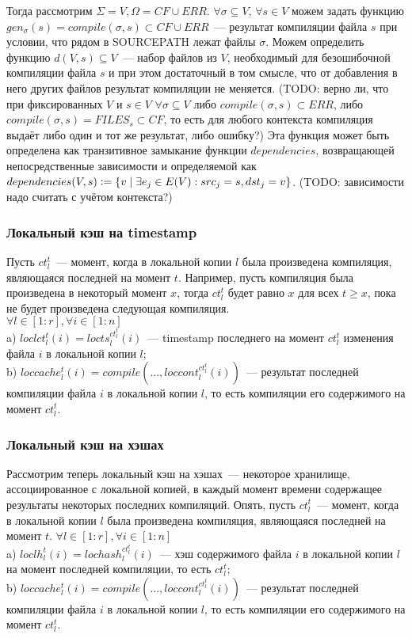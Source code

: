 Тогда рассмотрим $\Sigma = V, \Omega = CF \cup ERR$. $\forall \sigma \subseteq V$, $\forall s \in V$ можем задать функцию $gen_\sigma(s) = \textit{compile}(\sigma, s) \subset CF \cup ERR$~--- результат компиляции файла $s$ при условии, что рядом в SOURCEPATH лежат файлы $\sigma$. Можем определить функцию $d(V,s) \subseteq V$~--- набор файлов из $V$, необходимый для безошибочной компиляции файла $s$ и при этом достаточный в том смысле, что от добавления в него других файлов результат компиляции не меняется. (TODO: верно ли, что при фиксированных $V$ и $s \in V$ $\forall \sigma \subseteq V$ либо $\textit{compile}(\sigma, s) \subset ERR$, либо $\textit{compile}(\sigma, s) = FILES_s \subset CF$, то есть для любого контекста компиляция выдаёт либо один и тот же результат, либо ошибку?) Эта функция может быть определена как транзитивное замыкание функции $dependencies$, возвращающей непосредственные зависимости и определяемой как $dependencies(V,s) \vcentcolon= \{v \mid \exists e_j \in E(V): src_j = s, dst_j = v\}$. (TODO: зависимости надо считать с учётом контекста?)

\subsubsection{Локальный кэш на timestamp}

Пусть $ct_l^t$~--- момент, когда в локальной копии $l$ была произведена компиляция, являющаяся последней на момент $t$. Например, пусть компиляция была произведена в некоторый момент $x$, тогда $ct_l^t$ будет равно $x$ для всех $t \geqslant x$, пока не будет произведена следующая компиляция.\\
$\forall l \in [1:r], \forall i \in [1:n]$\\
\indent a) $loclct_l^t(i) = locts_l^{ct_l^t}(i)$~--- timestamp последнего на момент $ct_l^t$ изменения файла $i$ в локальной копии $l$;\\
\indent b) $loccache_l^t(i) = compile(..., loccont_l^{ct_l^t}(i))$~--- результат последней компиляции файла $i$ в локальной копии $l$, то есть компиляции его содержимого на момент $ct_l^t$.\\

\subsubsection{Локальный кэш на хэшах}

Рассмотрим теперь локальный кэш на хэшах~--- некоторое хранилище, ассоциированное с локальной копией, в каждый момент времени содержащее результаты некоторых последних компиляций. Опять, пусть $ct_l^t$~--- момент, когда в локальной копии $l$ была произведена компиляция, являющаяся последней на момент $t$.
$\forall l \in [1:r], \forall i \in [1:n]$\\
\indent a) $loclh_l^t(i) = lochash_l^{ct_l^t}(i)$~--- хэш содержимого файла $i$ в локальной копии $l$ на момент последней компиляции, то есть $ct_l^t$;\\
\indent b) $loccache_l^t(i) = compile(..., loccont_l^{ct_l^t}(i))$~--- результат последней компиляции файла $i$ в локальной копии $l$, то есть компиляции его содержимого на момент $ct_l^t$.\\

